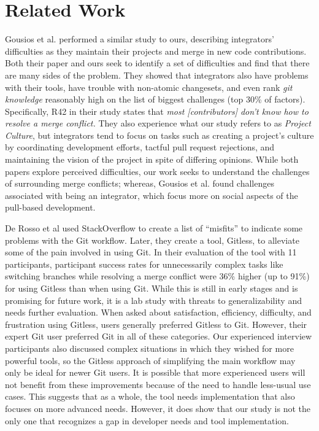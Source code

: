 \section{Related Work}\label{related_work}

Gousios et al. \cite{integrator_perspective} performed a similar study to ours, describing integrators' difficulties as they maintain their projects and merge in new code contributions. Both their paper and ours seek to identify a set of difficulties and find that there are many sides of the problem. They showed that integrators also have problems with their tools, have trouble with non-atomic changesets, and even rank \textit{git knowledge} reasonably high on the list of biggest challenges (top 30\% of factors). Specifically, R42 in their study states that \textit{most [contributors] don’t know
how to resolve a merge conflict.} They also experience what our study refers to as \textit{Project Culture}, but integrators tend to focus on tasks such as creating a project's culture by coordinating development efforts, tactful pull request rejections, and maintaining the vision of the project in spite of differing opinions. While both papers explore perceived difficulties, our work seeks to understand the challenges of surrounding merge conflicts; whereas, Gousios et al. found challenges associated with being an integrator, which focus more on social aspects of the pull-based development.

De Rosso et al \cite{DeRosso2016} used StackOverflow to create a list of ``misfits'' to indicate some problems with the Git workflow. Later, they create a tool, Gitless, to alleviate some of the pain involved in using Git. In their evaluation of the tool with 11 participants, participant success rates for unnecessarily complex tasks like  switching branches while resolving a merge conflict were 36\% higher (up to 91\%) for using Gitless than when using Git. While this is still in early stages and is promising for future work, it is a lab study with threats to generalizability and needs further evaluation. 
 When asked about satisfaction, efficiency, difficulty, and frustration using Gitless, users generally preferred Gitless to Git. However, their expert Git user preferred Git in all of these categories. Our experienced interview participants also discussed complex situations in which they wished for more powerful tools, so the Gitless approach of simplifying the main workflow may only be ideal for newer Git users. It is possible that more experienced users will not benefit from these improvements because of the need to handle less-usual use cases. This suggests that as a whole, the tool needs implementation that also focuses on more advanced needs. However, it does show that our study is not the only one that recognizes a gap in developer needs and tool implementation.

